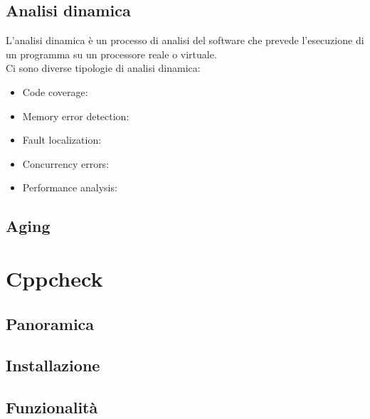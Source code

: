 \documentclass{article}
\begin{document}
\subsection{Analisi dinamica}
\label{sec:analisidinamica}

L'analisi dinamica è un processo di analisi del software che prevede
l'esecuzione di un programma su un processore reale o virtuale. \\

Ci sono diverse tipologie di analisi dinamica:

\begin{itemize}
    \item Code coverage:
    \item Memory error detection:
    \item Fault localization:
    \item Concurrency errors:
    \item Performance analysis:
\end{itemize}

\subsection{Aging}
\label{sec:aging}
 

\section{Cppcheck}

\subsection{Panoramica}
\label{sec:cppcheck:panoramica}

\subsection{Installazione}
\label{sec:cppcheck:installazione}

\subsection{Funzionalità}
\label{sec:cppcheck:funzionalita}

\end{document}
